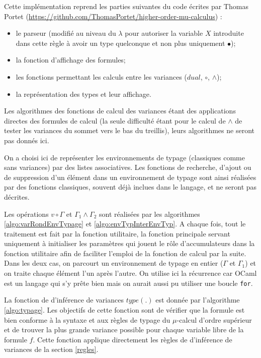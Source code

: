 \documentclass{rapport}
\theoremstyle{plain}
\theoremstyle{remark}
\theoremstyle{definition}
\begin{document}
Cette implémentation reprend les parties suivantes du code écrites par Thomas Portet (\url{https://github.com/ThomasPortet/higher-order-mu-calculus}) :
\begin{itemize}
	\item le parseur (modifié au niveau du $\lambda$ pour autoriser la variable $X$ introduite dans cette règle à avoir un type quelconque et non plus uniquement $\bullet$);
	\item la fonction d'affichage des formules;
	\item les fonctions permettant les calculs entre les variances ($dual$, $\circ$, $\wedge$);
	\item la représentation des types et leur affichage.
\end{itemize} 

Les algorithmes des fonctions de calcul des variances étant des applications directes des formules de calcul (la seule difficulté étant pour le calcul de $\wedge$ de tester les variances du sommet vers le bas du treillis), leurs algorithmes ne seront pas donnés ici. 

On a choisi ici de représenter les environnements de typage (classiques comme sans variances) par des listes associatives. Les fonctions de recherche, d'ajout ou de suppression d'un élément dans un environnement de typage sont ainsi réalisées par des fonctions classiques, souvent déjà inclues dans le langage, et ne seront pas décrites. 

Les opérations $v \circ \Gamma$ et $\Gamma_1 \wedge \Gamma_2$ sont réalisées par les algorithmes \ref{algo:varRondEnvTypage} et \ref{algo:envTypInterEnvTyp}. A chaque fois, tout le traitement est fait par la fonction utilitaire, la fonction principale servant uniquement à initialiser les paramètres qui jouent le rôle d'accumulateurs dans la fonction utilitaire afin de faciliter l'emploi de la fonction de calcul par la suite. Dans les deux cas, on parcourt un environnement de typage en entier ($\Gamma$ et $\Gamma_1$) et on traite chaque élément l'un après l'autre. On utilise ici la récurrence car OCaml est un langage qui s'y prête bien mais on aurait aussi pu utiliser une boucle \texttt{for}.

La fonction de d'inférence de variances $type(.)$ est donnée par l'algorithme \ref{algo:typage}. Les objectifs de cette fonction sont de vérifier que la formule est bien conforme à la syntaxe et aux règles de typage du $\mu$-calcul d'ordre supérieur et de trouver la plus grande variance possible pour chaque variable libre de la formule $f$. Cette fonction applique directement les règles de d'inférence de variances de la section \ref{regles}. 
\end{document}
